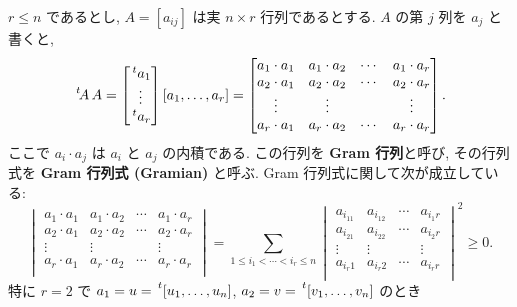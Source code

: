 \documentclass[12pt,twoside]{jarticle}
\begin{document}
\begin{question}
  $r\le n$ であるとし, $A=[a_{ij}]$ は実 $n\times r$ 行列であるとする.
  $A$ の第 $j$ 列を $a_j$ と書くと,
  \begin{equation*}
    \tp{\!A}\,A =
    \begin{bmatrix}
      \tp{a_1} \\
      \vdots \\
      \tp{a_r} \\
    \end{bmatrix}
    [a_1, \ldots, a_r]
    =
    \begin{bmatrix}
      a_1\cdot a_1 & a_1\cdot a_2 & \cdots & a_1\cdot a_r \\
      a_2\cdot a_1 & a_2\cdot a_2 & \cdots & a_2\cdot a_r \\
      \vdots       & \vdots       &        & \vdots \\
      a_r\cdot a_1 & a_r\cdot a_2 & \cdots & a_r\cdot a_r \\
    \end{bmatrix}.
  \end{equation*}
  ここで $a_i\cdot a_j$ は $a_i$ と $a_j$ の内積である.
  この行列を {\bf Gram 行列}と呼び, その行列式を 
  {\bf Gram 行列式 (Gramian)} と呼ぶ.
  Gram 行列式に関して次が成立している:
  \begin{equation*}
    \begin{vmatrix}
      a_1\cdot a_1 & a_1\cdot a_2 & \cdots & a_1\cdot a_r \\
      a_2\cdot a_1 & a_2\cdot a_2 & \cdots & a_2\cdot a_r \\
      \vdots       & \vdots       &        & \vdots \\
      a_r\cdot a_1 & a_r\cdot a_2 & \cdots & a_r\cdot a_r \\
    \end{vmatrix}
    =
    \sum_{1\le i_1<\cdots<i_r\le n}
    \begin{vmatrix}
      a_{i_11} & a_{i_12} & \cdots & a_{i_1r} \\
      a_{i_21} & a_{i_22} & \cdots & a_{i_2r} \\
      \vdots   & \vdots   &        & \vdots \\
      a_{i_r1} & a_{i_r2} & \cdots & a_{i_rr} \\
    \end{vmatrix}^2
    \ge 0.
  \end{equation*}
  特に $r=2$ で %
  $a_1=u=\tp{[u_1,\ldots,u_n]}$, $a_2=v=\tp{[v_1,\ldots,v_n]}$ のとき
  \begin{equation*}

\end{equation*}
\end{question}
\end{document}
